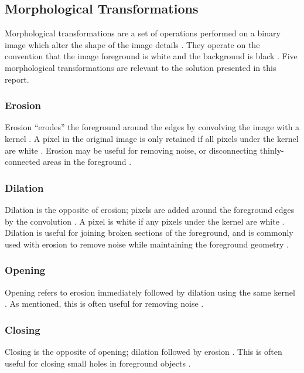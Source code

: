 \newpage
\subsection{Morphological Transformations}

Morphological transformations are a set of operations performed on a binary image which alter the shape of the image details \cite{opencv_mt}. They operate on the convention that the image foreground is white and the background is black \cite{opencv_mt}. Five morphological transformations are relevant to the solution presented in this report.

\subsubsection*{Erosion}

Erosion ``erodes'' the foreground around the edges by convolving the image with a kernel \cite{opencv_mt}. A pixel in the original image is only retained if all pixels under the kernel are white \cite{opencv_mt}. Erosion may be useful for removing noise, or disconnecting thinly-connected areas in the foreground \cite{opencv_mt}.

\subsubsection*{Dilation}

Dilation is the opposite of erosion; pixels are added around the foreground edges by the convolution \cite{opencv_mt}. A pixel is white if any pixels under the kernel are white \cite{opencv_mt}. Dilation is useful for joining broken sections of the foreground, and is commonly used with erosion to remove noise while maintaining the foreground geometry \cite{opencv_mt}.

\subsubsection*{Opening}

Opening refers to erosion immediately followed by dilation using the same kernel \cite{opencv_mt}. As mentioned, this is often useful for removing noise \cite{opencv_mt}.

\subsubsection*{Closing}

Closing is the opposite of opening; dilation followed by erosion \cite{opencv_mt}. This is often useful for closing small holes in foreground objects \cite{opencv_mt}.

